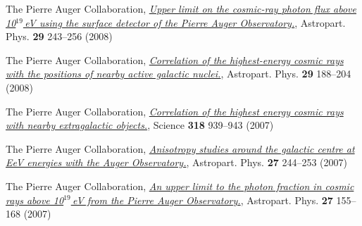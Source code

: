 \begin{etaremune}
\item {}The Pierre Auger Collaboration,
\href{http://dx.doi.org/10.1016/j.astropartphys.2008.01.003}{\emph{Upper limit
on the cosmic-ray photon flux above 10$^{19}$\,eV using the surface detector of
the Pierre Auger Observatory.}}, Astropart. Phys. {\bf 29} 243--256 (2008)

\item {}The Pierre Auger Collaboration,
\href{http://dx.doi.org/10.1016/j.astropartphys.2008.01.002}{\emph{Correlation
of the highest-energy cosmic rays with the positions of nearby active galactic
nuclei.}}, Astropart. Phys. {\bf 29} 188--204 (2008)

\item {}The Pierre Auger Collaboration,
\href{http://dx.doi.org/10.1126/science.1151124}{\emph{Correlation of the
highest energy cosmic rays with nearby extragalactic objects.}}, Science {\bf
318} 939--943 (2007)

\item {}The Pierre Auger Collaboration,
\href{http://dx.doi.org/10.1016/j.astropartphys.2006.11.002}{\emph{Anisotropy
studies around the galactic centre at EeV energies with the Auger
Observatory.}},  Astropart. Phys. {\bf 27} 244--253 (2007)

\item {}The Pierre Auger Collaboration,
\href{http://dx.doi.org/10.1016/j.astropartphys.2006.10.004}{\emph{An upper
limit to the photon fraction in cosmic rays above 10$^{19}$\,eV from the Pierre
Auger Observatory.}}, Astropart. Phys. {\bf 27} 155--168 (2007)
\end{etaremune}
